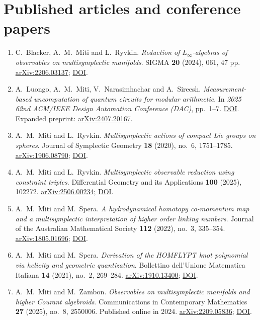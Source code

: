 \documentclass[11pt,a4paper]{article}
\begin{document}
\section*{Published articles and conference papers}
\begin{enumerate}
\item C.~Blacker, A.~M.~Miti and L.~Ryvkin. \emph{Reduction of $L_\infty$-algebras of observables on multisymplectic manifolds}. SIGMA \textbf{20} (2024), 061, 47 pp. \href{https://arxiv.org/abs/2206.03137}{arXiv:2206.03137}; \href{https://doi.org/10.3842/SIGMA.2024.061}{DOI}.
\item A.~Luongo, A.~M.~Miti, V.~Narasimhachar and A.~Sireesh. \emph{Measurement-based uncomputation of quantum circuits for modular arithmetic}. In \emph{2025 62nd ACM/IEEE Design Automation Conference (DAC)}, pp.~1--7. \href{https://doi.org/10.1109/DAC63849.2025.11132981}{DOI}. Expanded preprint: \href{https://arxiv.org/abs/2407.20167}{arXiv:2407.20167}.
\item A.~M.~Miti and L.~Ryvkin. \emph{Multisymplectic actions of compact Lie groups on spheres}. Journal of Symplectic Geometry \textbf{18} (2020), no.~6, 1751--1785. \href{https://arxiv.org/abs/1906.08790}{arXiv:1906.08790}; \href{https://doi.org/10.4310/JSG.2020.v18.n6.a6}{DOI}.
\item A.~M.~Miti and L.~Ryvkin. \emph{Multisymplectic observable reduction using constraint triples}. Differential Geometry and its Applications \textbf{100} (2025), 102272. \href{https://arxiv.org/abs/2506.00234}{arXiv:2506.00234}; \href{https://doi.org/10.1016/j.difgeo.2025.102272}{DOI}.
\item A.~M.~Miti and M.~Spera. \emph{A hydrodynamical homotopy co-momentum map and a multisymplectic interpretation of higher order linking numbers}. Journal of the Australian Mathematical Society \textbf{112} (2022), no.~3, 335--354. \href{https://arxiv.org/abs/1805.01696}{arXiv:1805.01696}; \href{https://doi.org/10.1017/S1446788720000518}{DOI}.
\item A.~M.~Miti and M.~Spera. \emph{Derivation of the HOMFLYPT knot polynomial via helicity and geometric quantization}. Bollettino dell'Unione Matematica Italiana \textbf{14} (2021), no.~2, 269--284. \href{https://arxiv.org/abs/1910.13400}{arXiv:1910.13400}; \href{https://doi.org/10.1007/s40574-020-00254-5}{DOI}.
\item A.~M.~Miti and M.~Zambon. \emph{Observables on multisymplectic manifolds and higher Courant algebroids}. Communications in Contemporary Mathematics \textbf{27} (2025), no.~8, 2550006. Published online in 2024. \href{https://arxiv.org/abs/2209.05836}{arXiv:2209.05836}; \href{https://doi.org/10.1142/S0219199725500063}{DOI}.
\end{enumerate}
\end{document}
